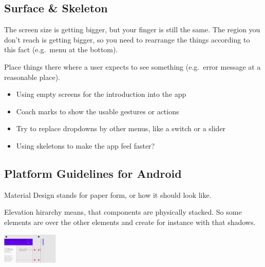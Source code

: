\subsection{Surface \& Skeleton}

\begin{breakbox}

The screen size is getting bigger, but your finger is still the same.
The region you don't reach is getting bigger, so you need to rearrange
the things according to this fact (e.g.~menu at the bottom).

\end{breakbox}

\begin{breakbox}

Place things there where a user expects to see something (e.g.~error
message at a reasonable place).

\end{breakbox}

\begin{breakbox}

\begin{itemize}
\tightlist
\item
  Using empty screens for the introduction into the app
\item
  Coach marks to show the usable gestures or actions
\item
  Try to replace dropdowns by other menus, like a switch or a slider
\item
  Using skeletons to make the app feel faster?
\end{itemize}

\end{breakbox}


\hypertarget{platform-guidelines-for-android}{%
\subsection{Platform Guidelines for
Android}\label{platform-guidelines-for-android}}

\begin{breakbox}

Material Design stands for paper form, or how it should look
like.
\end{breakbox}

\columnbreak
\begin{breakbox}

Elevation hirarchy means, that components are physically stacked. So some elements are over the other elements and create for instance with that shadows.

\includegraphics[width=0.2\textwidth]{figures/elevationHirarchy.png}
\end{breakbox}

